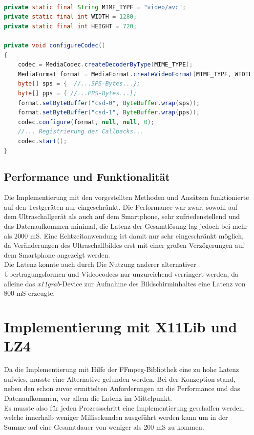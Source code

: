 \begin{lstlisting}[caption=Konfiguration des MediaCodec, label=lst:config_media_codec, language=Java]

private static final String MIME_TYPE = "video/avc";
private static final int WIDTH = 1280;
private static final int HEIGHT = 720;

private void configureCodec()
{
	codec = MediaCodec.createDecoderByType(MIME_TYPE);
	MediaFormat format = MediaFormat.createVideoFormat(MIME_TYPE, WIDTH, HEIGHT);
	byte[] sps = {  //...SPS-Bytes...};
	byte[] pps = { //...PPS-Bytes...};
	format.setByteBuffer("csd-0", ByteBuffer.wrap(sps));
	format.setByteBuffer("csd-1", ByteBuffer.wrap(pps));
	codec.configure(format, null, null, 0);
	//... Registrierung der Callbacks...
	codec.start();
}
\end{lstlisting}

\subsection{Performance und Funktionalität} \label{PerfFunk}
Die Implementierung mit den vorgestellten Methoden und Ansätzen funktionierte auf den Testgeräten nur eingeschränkt. Die Performance war zwar, sowohl auf dem Ultraschallgerät als auch auf dem Smartphone, sehr zufriedenstellend und das Datenaufkommen minimal, die Latenz der Gesamtlösung lag jedoch bei mehr als 2000 mS. Eine Echtzeitanwendung ist damit nur sehr eingeschränkt möglich, da Veränderungen des Ultraschallbildes erst mit einer großen Verzögerungen auf dem Smartphone angezeigt werden.\\
Die Latenz konnte auch durch Die Nutzung anderer alternativer Übertragungsformen und Videocodecs nur unzureichend verringert werden, da alleine das \textit{x11grab}-Device zur Aufnahme des Bildschirminhaltes eine Latenz von 800 mS erzeugte. \\

\section{Implementierung mit X11Lib und LZ4}
Da die Implementierung mit Hilfe der FFmpeg-Bibliothek eine zu hohe Latenz aufwies, musste eine Alternative gefunden werden. Bei der Konzeption stand, neben den schon zuvor ermittelten Anforderungen an die Performance und das Datenaufkommen, vor allem die Latenz im Mittelpunkt.\\
Es musste also für jeden Prozessschritt eine Implementierung geschaffen werden, welche innerhalb weniger Millisekunden ausgeführt werden kann um in der Summe auf eine Gesamtdauer von weniger als 200 mS zu kommen. 

